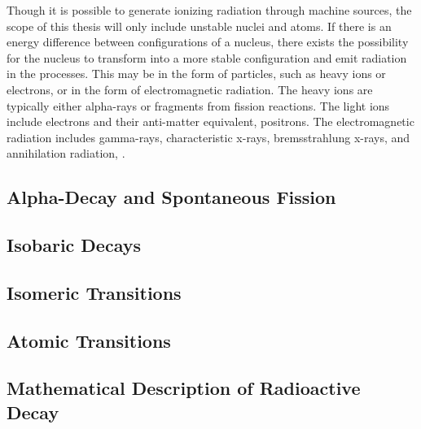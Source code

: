 Though it is possible to generate ionizing radiation through machine sources, the scope of this thesis will only include unstable nuclei and atoms. If there is an energy difference between configurations of a nucleus, there exists the possibility for the nucleus to transform into a more stable configuration and emit radiation in the processes. This may be in the form of particles, such as heavy ions or electrons, or in the form of electromagnetic radiation. The heavy ions are typically either alpha-rays or fragments from fission reactions. The light ions include electrons and their anti-matter equivalent, positrons. The electromagnetic radiation includes gamma-rays, characteristic x-rays, bremsstrahlung x-rays, and annihilation radiation, \cite{johnson_health_physics_intro_5ed}. 


\subsection{Alpha-Decay and Spontaneous Fission}\label{toc:intro.ss.alphaAndFission}



\subsection{Isobaric Decays}\label{intro.toc:ss.isobaricDecays}

\subsection{Isomeric Transitions}

\subsection{Atomic Transitions}

\subsection{Mathematical Description of Radioactive Decay}
